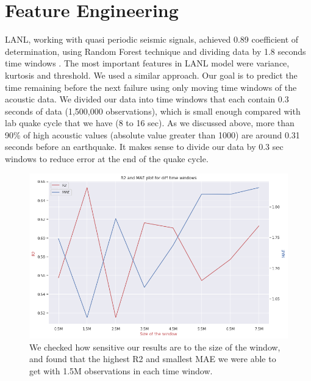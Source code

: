 \documentclass[]{llncs} %
\begin{document}
\section{Feature Engineering}
LANL, working with quasi periodic seismic signals, achieved 0.89 coefficient of determination, using Random Forest technique and dividing data by 1.8 seconds time windows \cite{Bertrand}.  The most important features in LANL model were variance, kurtosis and threshold. We used a similar approach. Our goal is to predict the time remaining before the next failure using only moving time windows of the acoustic data. We divided our data into time windows that each contain 0.3 seconds of data (1,500,000 observations), which is small enough compared with lab quake cycle that we have (8 to 16 sec). As we discussed above, more than 90\% of high acoustic values (absolute value greater than 1000) are around 0.31 seconds before an earthquake. It makes sense to divide our data by 0.3 sec windows to reduce error at the end of the quake cycle. 

\begin{figure}[h!]
	\centering
	\includegraphics[width=01\linewidth]{rSquaredandMAE}
	\caption{We checked how sensitive our results are to the size of the window, and found that the highest R2 and smallest MAE we were able to get with 1.5M observations in each time window.}
	\label{fig:rSquaredandMAE}
\end{figure}
\end{document}
